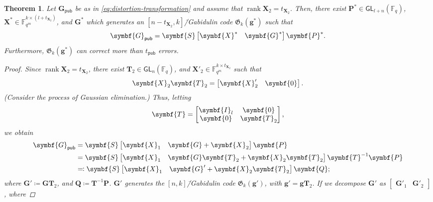 \documentclass[version=last, paper=A4, parskip=half, oneside,%
toc=bibliography, toc=listof, listof=leveldown]{scrbook}
\theoremstyle{plain}
\newtheorem{theorem}{Theorem}
\theoremstyle{definition}
\theoremstyle{remark}
\renewcommand*{\vec}{\symbf}
\newcommand*{\mat}{\symbf}
\DeclareMathOperator{\rank}{rank}
\newcommand*{\GL}{\ensuremath{\mathsf{GL}}}
\newcommand*{\pub}{\ensuremath{\mathsf{pub}}}
\newcommand*{\FF}{\ensuremath{\mathbb{F}}}
\newcommand*{\Gab}{\ensuremath{\mathfrak{G}}}
\begin{document}
\begin{theorem}
  Let \(\mat{G}_{\pub}\) be as in \cref{eq:distortion-transformation} and assume
  that \(\rank \mat{X}_2 = t_{\mat{X}_2}\).  Then, there exist
  \(\mat{P}^* \in \GL_{l + n}(\FF_q)\),
  \(\mat{X}^* \in \FF_{q^m}^{k \times (l + t_{\mat{X}_2})}\), and \(\mat{G}^*\)
  which generates an \([n - t_{\mat{X}_2}, k]\)\=/Gabidulin code
  \(\Gab_k(\vec{g}^*)\) such that
  \[
    \mat{G}_{\pub} =
    \mat{S} \begin{bmatrix} \mat{X}^* & \mat{G}^* \end{bmatrix} \mat{P}^*\text.
  \]
  Furthermore, \(\Gab_k(\vec{g}^*)\) can correct more than \(t_{\pub}\) errors.
  \begin{proof}
    Since \(\rank \mat{X}_2 = t_{\mat{X}_2}\), there exist
    \(\mat{T}_2 \in \GL_n(\FF_q)\), and
    \(\mat{X}'_2 \in \FF_{q^m}^{k \times t_{\mat{X}_2}}\) such that
    \[
      \mat{X}_2 \mat{T}_2 = \begin{bmatrix} \mat{X}'_2 & \mat{0} \end{bmatrix}\text.
    \]
    (Consider the process of Gaussian elimination.)  Thus, letting
    \[
      \mat{T} =
      \begin{bmatrix}
        \mat{I}_l & \mat{0} \\
        \mat{0} & \mat{T}_2
      \end{bmatrix}\text,
    \]
    we obtain
    \[
      \begin{aligned}
        \mat{G}_{\pub} &= \mat{S} \begin{bmatrix} \mat{X}_1 & \mat{G} + \mat{X}_2 \end{bmatrix} \mat{P} \\
        &= \mat{S} \begin{bmatrix} \mat{X}_1 & \mat{G} \mat{T}_2 + \mat{X}_2 \mat{T}_2 \end{bmatrix} \mat{T}^{-1} \mat{P} \\
        &\eqqcolon \mat{S} \begin{bmatrix} \mat{X}_1 & \mat{G}' + \mat{X}_2 \mat{T}_2 \end{bmatrix} \mat{Q}\text;
      \end{aligned}
    \]
    where \(\mat{G}' \coloneqq \mat{G} \mat{T}_2\), and
    \(\mat{Q} \coloneqq \mat{T}^{-1} \mat{P}\).  \(\mat{G}'\) generates the
    \([n, k]\)\=/Gabidulin code \(\Gab_k(\vec{g}')\), with
    \(\vec{g}' = \vec{g} \mat{T}_2\).  If we decompose \(\mat{G}'\) as
    \(\begin{bmatrix} \mat{G}'_1 & \mat{G}'_2 \end{bmatrix}\), where

\end{proof}
\end{theorem}
\end{document}
